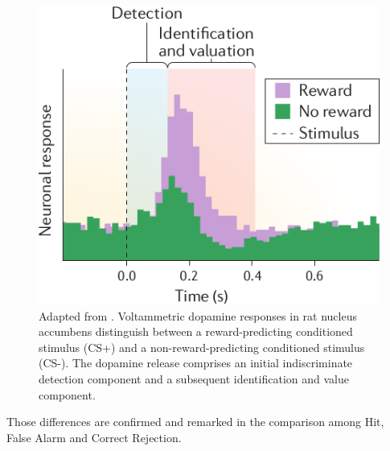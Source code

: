 \begin{figure}
    \centering
    \includegraphics[scale=0.4]{figures/Schultz2016CSMod.png}
    \caption{Adapted from \cite{Schultz2016}. Voltammetric dopamine responses in rat nucleus accumbens distinguish between a reward-predicting conditioned stimulus (CS+) and a non-reward-predicting conditioned stimulus (CS-). The dopamine release comprises an initial indiscriminate detection component and a subsequent identification and value component.}
    \label{fig:dopCS}
\end{figure}
Those differences are confirmed and remarked in the comparison among Hit, False Alarm and Correct Rejection.
